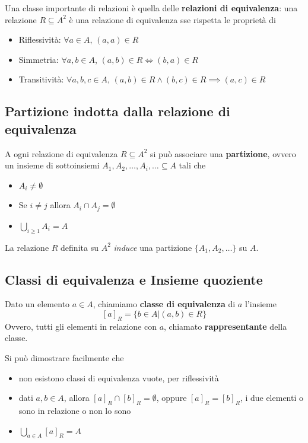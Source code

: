 Una classe importante di relazioni è quella delle \textbf{relazioni di equivalenza}: una relazione $R \subseteq A^2$ è una relazione di equivalenza sse rispetta le proprietà di
\begin{itemize}
	\item Riflessività: $\forall a \in A$, $(a,a) \in R$
	\item Simmetria: $\forall a,b \in A$, $(a,b) \in R \Leftrightarrow (b,a) \in R$
	\item Transitività: $\forall a,b,c \in A$, $(a,b) \in R \wedge (b,c) \in R \implies (a,c) \in R$
\end{itemize}

\subsection{Partizione indotta dalla relazione di equivalenza}
A ogni relazione di equivalenza $R \subseteq A^2$ si può associare una \textbf{partizione}, ovvero un insieme di sottoinsiemi $A_{1}, A_{2}, \ldots, A_i, \ldots \subseteq A$ tali che
\begin{itemize}
	\item $A_i \neq \emptyset$
	\item Se $i \neq j$ allora $A_i \cap A_j = \emptyset$
	\item $\bigcup_{i \geq 1} A_i = A$
\end{itemize}

La relazione $R$ definita su $A^2$ \textit{induce} una partizione $\{A_1, A_2, \dots\}$ su $A$.

\subsection{Classi di equivalenza e Insieme quoziente}
Dato un elemento $a \in A$, chiamiamo \textbf{classe di equivalenza} di $a$ l'insieme
$$ [a]_R = \{b \in A | (a,b) \in R \} $$
Ovvero, tutti gli elementi in relazione con $a$, chiamato \textbf{rappresentante} della classe.

Si può dimostrare facilmente che
\begin{itemize}
	\item non esistono classi di equivalenza vuote, per riflessività
	\item dati $a,b \in A$, allora $[a]_R \cap [b]_R = \emptyset$, oppure $[a]_R = [b]_R$, i due elementi o sono in relazione o non lo sono
	\item $\bigcup_{a \in A} [a]_R = A$
\end{itemize}


